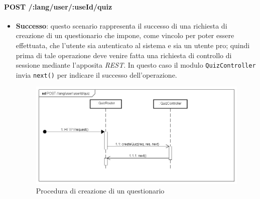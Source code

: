 \paragraph{POST /:lang/user/:useId/quiz} %
\begin{itemize}
\item \textbf{Successo}: questo scenario rappresenta il successo di una richiesta di creazione di un questionario che impone, come vincolo per poter essere effettuata, che l'utente sia autenticato al sistema e sia un utente pro; quindi prima di tale operazione deve venire fatta una richiesta di controllo di sessione mediante l'apposita \textit{REST}. In questo caso il modulo \texttt{QuizController} invia \texttt{next()} per indicare il successo dell'operazione.
\label{Procedura di creazione di un questionario}
\begin{figure}[ht]
	\centering
	\includegraphics[scale=0.40]{UML/DiagrammiDiSequenza/Back-end/POST__lang_user_userId_quiz_success.png}
	\caption{Procedura di creazione di un questionario}
\end{figure}
\FloatBarrier


\end{itemize}
